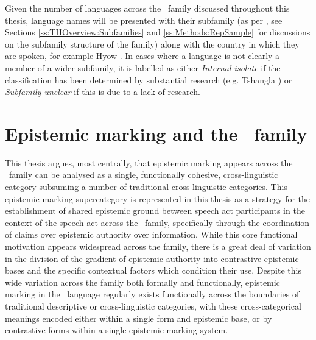 Given the number of languages across the \lfam\ family discussed throughout this thesis, language names will be presented with their subfamily (as per , see Sections \ref{ss:THOverview:Subfamilies} and \ref{ss:Methods:RepSample} for discussions on the subfamily structure of the family) along with the country in which they are spoken, for example Hyow \cite[Kukish: Myanmar,][]{Zakaria2018}. In cases where a language is not clearly a member of a wider subfamily, it is labelled as either \textit{Internal isolate} if the classification has been determined by substantial research (e.g. Tshangla \cite[Internal isolate: Bhutan,][]{Grollmann2020}) or \textit{Subfamily unclear} if this is due to a lack of research.


\section{Epistemic marking and the \lfam\ family}\label{s:Intro:Thesis}
This thesis argues, most centrally, that epistemic marking appears across the \lfam\ family can be analysed as a single, functionally cohesive, cross-linguistic category subsuming a number of traditional cross-linguistic categories. This epistemic marking supercategory is represented in this thesis as a strategy for the establishment of shared epistemic ground between speech act participants in the context of the speech act across the \lfam\ family, specifically through the coordination of claims over epistemic authority over information. While this core functional motivation appears widespread across the family, there is a great deal of variation in the division of the gradient of epistemic authority into contrastive epistemic bases and the specific contextual factors which condition their use. Despite this wide variation across the family both formally and functionally, epistemic marking in the \lfam\ language regularly exists functionally across the boundaries of traditional descriptive or cross-linguistic categories, with these cross-categorical meanings encoded either within a single form and epistemic base, or by contrastive forms within a single epistemic-marking system.

